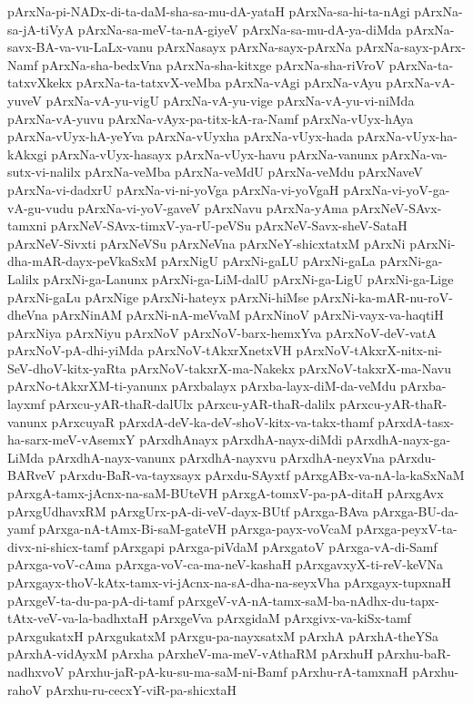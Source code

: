 {pArxNa-pi-NADx-di-ta-daM-sha-sa-mu-dA-yataH
pArxNa-sa-hi-ta-nAgi
pArxNa-sa-jA-tiVyA
pArxNa-sa-meV-ta-nA-giyeV
pArxNa-sa-mu-dA-ya-diMda
pArxNa-savx-BA-va-vu-LaLx-vanu
pArxNasayx
pArxNa-sayx-pArxNa
pArxNa-sayx-pArx-Namf
pArxNa-sha-bedxVna
pArxNa-sha-kitxge
pArxNa-sha-riVroV
pArxNa-ta-tatxvXkekx
pArxNa-ta-tatxvX-veMba
pArxNa-vAgi
pArxNa-vAyu
pArxNa-vA-yuveV
pArxNa-vA-yu-vigU
pArxNa-vA-yu-vige
pArxNa-vA-yu-vi-niMda
pArxNa-vA-yuvu
pArxNa-vAyx-pa-titx-kA-ra-Namf
pArxNa-vUyx-hAya
pArxNa-vUyx-hA-yeYva
pArxNa-vUyxha
pArxNa-vUyx-hada
pArxNa-vUyx-ha-kAkxgi
pArxNa-vUyx-hasayx
pArxNa-vUyx-havu
pArxNa-vanunx
pArxNa-va-sutx-vi-nalilx
pArxNa-veMba
pArxNa-veMdU
pArxNa-veMdu
pArxNaveV
pArxNa-vi-dadxrU
pArxNa-vi-ni-yoVga
pArxNa-vi-yoVgaH
pArxNa-vi-yoV-ga-vA-gu-vudu
pArxNa-vi-yoV-gaveV
pArxNavu
pArxNa-yAma
pArxNeV-SAvx-tamxni
pArxNeV-SAvx-timxV-ya-rU-peVSu
pArxNeV-Savx-sheV-SataH
pArxNeV-Sivxti
pArxNeVSu
pArxNeVna
pArxNeY-shicxtatxM
pArxNi
pArxNi-dha-mAR-dayx-peVkaSxM
pArxNigU
pArxNi-gaLU
pArxNi-gaLa
pArxNi-ga-Lalilx
pArxNi-ga-Lanunx
pArxNi-ga-LiM-dalU
pArxNi-ga-LigU
pArxNi-ga-Lige
pArxNi-gaLu
pArxNige
pArxNi-hateyx
pArxNi-hiMse
pArxNi-ka-mAR-nu-roV-dheVna
pArxNinAM
pArxNi-nA-meVvaM
pArxNinoV
pArxNi-vayx-va-haqtiH
pArxNiya
pArxNiyu
pArxNoV
pArxNoV-barx-hemxYva
pArxNoV-deV-vatA
pArxNoV-pA-dhi-yiMda
pArxNoV-tAkxrXnetxVH
pArxNoV-tAkxrX-nitx-ni-SeV-dhoV-kitx-yaRta
pArxNoV-takxrX-ma-Nakekx
pArxNoV-takxrX-ma-Navu
pArxNo-tAkxrXM-ti-yanunx
pArxbalayx
pArxba-layx-diM-da-veMdu
pArxba-layxmf
pArxcu-yAR-thaR-dalUlx
pArxcu-yAR-thaR-dalilx
pArxcu-yAR-thaR-vanunx
pArxcuyaR
pArxdA-deV-ka-deV-shoV-kitx-va-takx-thamf
pArxdA-tasx-ha-sarx-meV-vAsemxY
pArxdhAnayx
pArxdhA-nayx-diMdi
pArxdhA-nayx-ga-LiMda
pArxdhA-nayx-vanunx
pArxdhA-nayxvu
pArxdhA-neyxVna
pArxdu-BARveV
pArxdu-BaR-va-tayxsayx
pArxdu-SAyxtf
pArxgABx-va-nA-la-kaSxNaM
pArxgA-tamx-jAcnx-na-saM-BUteVH
pArxgA-tomxV-pa-pA-ditaH
pArxgAvx
pArxgUdhavxRM
pArxgUrx-pA-di-veV-dayx-BUtf
pArxga-BAva
pArxga-BU-da-yamf
pArxga-nA-tAmx-Bi-saM-gateVH
pArxga-payx-voVcaM
pArxga-peyxV-ta-divx-ni-shicx-tamf
pArxgapi
pArxga-piVdaM
pArxgatoV
pArxga-vA-di-Samf
pArxga-voV-cAma
pArxga-voV-ca-ma-neV-kashaH
pArxgavxyX-ti-reV-keVNa
pArxgayx-thoV-kAtx-tamx-vi-jAcnx-na-sA-dha-na-seyxVha
pArxgayx-tupxnaH
pArxgeV-ta-du-pa-pA-di-tamf
pArxgeV-vA-nA-tamx-saM-ba-nAdhx-du-tapx-tAtx-veV-va-la-badhxtaH
pArxgeVva
pArxgidaM
pArxgivx-va-kiSx-tamf
pArxgukatxH
pArxgukatxM
pArxgu-pa-nayxsatxM
pArxhA
pArxhA-theYSa
pArxhA-vidAyxM
pArxha
pArxheV-ma-meV-vAthaRM
pArxhuH
pArxhu-baR-nadhxvoV
pArxhu-jaR-pA-ku-su-ma-saM-ni-Bamf
pArxhu-rA-tamxnaH
pArxhu-rahoV
pArxhu-ru-cecxY-viR-pa-shicxtaH
}
